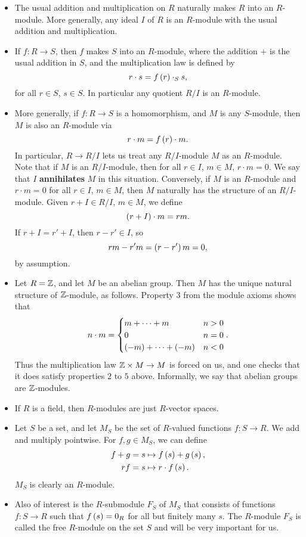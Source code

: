 \begin{example*}
\hfill
\begin{itemize}
\item The usual addition and multiplication on $ R $ naturally makes $ R $ into an $ R $-module. More generally, any ideal $ I $ of $ R $ is an $ R $-module with the usual addition and multiplication.
\item If $ f : R \to S $, then $ f $ makes $ S $ into an $ R $-module, where the addition $ + $ is the usual addition in $ S $, and the multiplication law is defined by
$$ r \cdot s = f\left( r \right) \cdot_S s, $$
for all $ r \in S $, $ s \in S $. In particular any quotient $ R / I $ is an $ R $-module.
\item More generally, if $ f : R \to S $ is a homomorphism, and $ M $ is any $ S $-module, then $ M $ is also an $ R $-module via
$$ r \cdot m = f\left( r \right) \cdot m. $$
In particular, $ R \to R / I $ lets us treat any $ R / I $-module $ M $ as an $ R $-module. Note that if $ M $ is an $ R / I $-module, then for all $ r \in I $, $ m \in M $, $ r \cdot m = 0 $. We say that $ I $ \textbf{annihilates} $ M $ in this situation. Conversely, if $ M $ is an $ R $-module and $ r \cdot m = 0 $ for all $ r \in I $, $ m \in M $, then $ M $ naturally has the structure of an $ R / I $-module. Given $ r + I \in R / I $, $ m \in M $, we define
$$ \left( r + I \right) \cdot m = rm. $$
If $ r + I = r' + I $, then $ r - r' \in I $, so
$$ rm - r'm = \left( r - r' \right)m = 0, $$
by assumption.
\item Let $ R = \mathbb{Z} $, and let $ M $ be an abelian group. Then $ M $ has the unique natural structure of $ \mathbb{Z} $-module, as follows. Property $ 3 $ from the module axioms shows that
$$ n \cdot m =
\begin{cases}
m + \dots + m & n > 0 \\
0 & n = 0 \\
\left( -m \right) + \dots + \left( -m \right) & n < 0
\end{cases}.
$$
Thus the multiplication law $ \mathbb{Z} \times M \to M $ is forced on us, and one checks that it does satisfy properties $ 2 $ to $ 5 $ above. Informally, we say that abelian groups are $ \mathbb{Z} $-modules.
\item If $ R $ is a field, then $ R $-modules are just $ R $-vector spaces.
\item Let $ S $ be a set, and let $ M_S $ be the set of $ R $-valued functions $ f : S \to R $. We add and multiply pointwise. For $ f, g \in M_S $, we can define
\begin{align*}
f + g & = s \mapsto f\left( s \right) + g\left( s \right), \\
rf & = s \mapsto r \cdot f\left( s \right).
\end{align*}
$ M_S $ is clearly an $ R $-module.
\item Also of interest is the $ R $-submodule $ F_S $ of $ M_S $ that consists of functions $ f : S \to R $ such that $ f\left( s \right) = 0_R $ for all but finitely many $ s $. The $ R $-module $ F_S $ is called the free $ R $-module on the set $ S $ and will be very important for us.
\end{itemize}
\end{example*}

